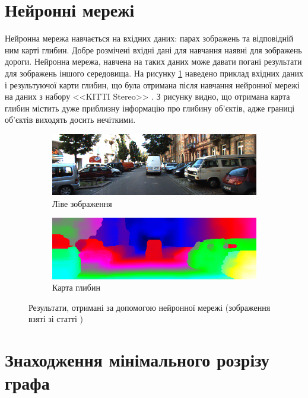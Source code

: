 \section{Нейронні мережі}

Нейронна мережа навчається на вхідних даних:
парах зображень та відповідній ним карті глибин.
Добре розмічені вхідні дані для навчання
наявні для зображень дороги.
Нейронна мережа, навчена на таких даних може давати погані результати для
зображень іншого середовища.
На рисунку \ref{fig:overview:luo:nn}
наведено приклад вхідних даних і результуючої карти глибин,
що була отримана після навчання нейронної мережі на даних з набору
<<KITTI Stereo>> \cite{overview:geiger:nn}.
З рисунку видно,
що отримана карта глибин містить дуже приблизну інформацію про глибину об'єктів,
адже границі об'єктів виходять досить нечіткими.

\begin{figure}[h]
  \centering
  \begin{subfigure}[b]{0.49\textwidth}
      \includegraphics[width=\textwidth]{images/overview_luo_nn_left}
      \caption{Ліве зображення}
  \end{subfigure}
  \hfill
  \begin{subfigure}[b]{0.49\textwidth}
      \includegraphics[width=\textwidth]{images/overview_luo_nn_result}
      \caption{Карта глибин}
  \end{subfigure}
  \caption{Результати,
           отримані за допомогою нейронної мережі
           (зображення взяті зі статті \cite{overview:luo:nn})}
  \label{fig:overview:luo:nn}
\end{figure}

\section{Знаходження мінімального розрізу графа}

